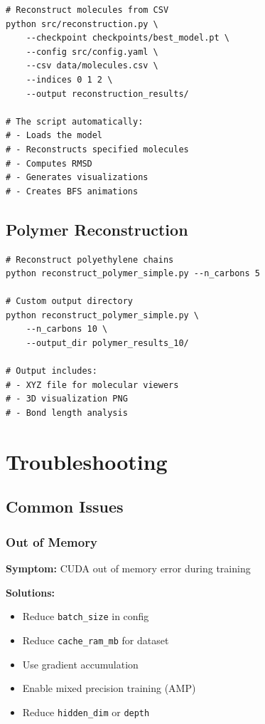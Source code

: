 \documentclass[11pt,a4paper]{article}
\begin{document}
\begin{verbatim}
# Reconstruct molecules from CSV
python src/reconstruction.py \
    --checkpoint checkpoints/best_model.pt \
    --config src/config.yaml \
    --csv data/molecules.csv \
    --indices 0 1 2 \
    --output reconstruction_results/

# The script automatically:
# - Loads the model
# - Reconstructs specified molecules
# - Computes RMSD
# - Generates visualizations
# - Creates BFS animations
\end{verbatim}

\subsection{Polymer Reconstruction}

\begin{verbatim}
# Reconstruct polyethylene chains
python reconstruct_polymer_simple.py --n_carbons 5

# Custom output directory
python reconstruct_polymer_simple.py \
    --n_carbons 10 \
    --output_dir polymer_results_10/

# Output includes:
# - XYZ file for molecular viewers
# - 3D visualization PNG
# - Bond length analysis
\end{verbatim}

\section{Troubleshooting}

\subsection{Common Issues}

\subsubsection{Out of Memory}

\textbf{Symptom:} CUDA out of memory error during training

\textbf{Solutions:}
\begin{itemize}
    \item Reduce \texttt{batch\_size} in config
    \item Reduce \texttt{cache\_ram\_mb} for dataset
    \item Use gradient accumulation
    \item Enable mixed precision training (AMP)
    \item Reduce \texttt{hidden\_dim} or \texttt{depth}
\end{itemize}
\end{document}
